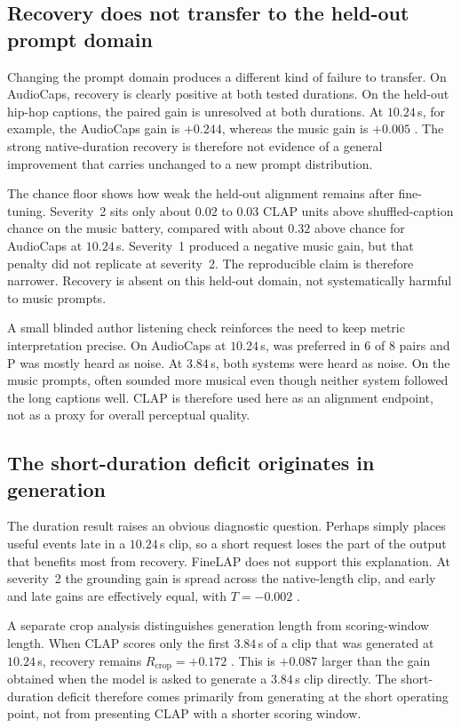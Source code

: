 \subsection{Recovery does not transfer to the held-out prompt domain}
Changing the prompt domain produces a different kind of failure to transfer. On AudioCaps, recovery is clearly positive at both tested durations. On the held-out hip-hop captions, the paired gain is unresolved at both durations. At $10.24$\,s, for example, the AudioCaps gain is $+0.244$, whereas the music gain is $+0.005$ . The strong native-duration recovery is therefore not evidence of a general improvement that carries unchanged to a new prompt distribution.

The chance floor shows how weak the held-out alignment remains after fine-tuning. Severity~2 \PFT{} sits only about $0.02$ to $0.03$ CLAP units above shuffled-caption chance on the music battery, compared with about $0.32$ above chance for AudioCaps at $10.24$\,s. Severity~1 produced a negative music gain, but that penalty did not replicate at severity~2. The reproducible claim is therefore narrower. Recovery is absent on this held-out domain, not systematically harmful to music prompts.

A small blinded author listening check reinforces the need to keep metric interpretation precise. On AudioCaps at $10.24$\,s, \PFT{} was preferred in 6 of 8 pairs and P was mostly heard as noise. At $3.84$\,s, both systems were heard as noise. On the music prompts, \PFT{} often sounded more musical even though neither system followed the long captions well. CLAP is therefore used here as an alignment endpoint, not as a proxy for overall perceptual quality.

\subsection{The short-duration deficit originates in generation}
The duration result raises an obvious diagnostic question. Perhaps \PFT{} simply places useful events late in a $10.24$\,s clip, so a short request loses the part of the output that benefits most from recovery. FineLAP does not support this explanation. At severity~2 the grounding gain is spread across the native-length clip, and early and late gains are effectively equal, with $T=-0.002$ .

A separate crop analysis distinguishes generation length from scoring-window length. When CLAP scores only the first $3.84$\,s of a clip that was generated at $10.24$\,s, recovery remains $R_{\mathrm{crop}}=+0.172$ . This is $+0.087$  larger than the gain obtained when the model is asked to generate a $3.84$\,s clip directly. The short-duration deficit therefore comes primarily from generating at the short operating point, not from presenting CLAP with a shorter scoring window.

